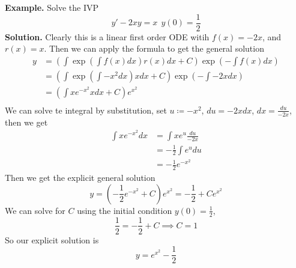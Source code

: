 \documentclass[openany]{report}
\begin{document}
\textbf{Example.} Solve the IVP 
\[y' - 2xy = x \ \ y(0) = \frac{1}{2}\]
\textbf{Solution.} Clearly this is a linear first order ODE witih $f(x) = -2x$, and $r(x) = x$. Then we can apply the formula to get the general solution
\begin{align*}
    y &= \left(\int \exp\left(\int f(x)dx\right)r(x)dx +C \right)\exp\left(-\int f(x)dx\right)  \\
    &=  \left(\int \exp\left(\int -x^2dx\right)xdx + C\right)\exp\left(-\int -2xdx\right)\\
    &= \left(\int x e^{-x^2}xdx + C\right)e^{x^2}\\
\end{align*}
We can solve te integral by substitution, set $u \coloneqq -x^2$, $du = -2xdx$, $dx = \frac{du}{-2x}$, then we get 
\begin{align*}
    \int xe^{-x^2}dx &= \int xe^u \frac{du}{-2x}\\
    & = -\frac{1}{2}\int e^udu\\
    &= -\frac{1}{2} e^{-x^2}
\end{align*}
Then we get the explicit general solution
\[y =  \left(-\frac{1}{2}e^{-x^2} + C\right)  e^{x^2} = -\frac{1}{2} + Ce^{x^2}\]
We can solve for $C$ using the initial condition $y(0) = \frac{1}{2}$,
\[\frac{1}{2} = -\frac{1}{2} + C \implies C = 1\]
So our explicit solution is 
\[y = e^{x^2} -\frac{1}{2}\] 
\end{document}
